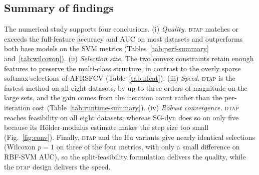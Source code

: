 \documentclass[]{interact}
\theoremstyle{plain}
\theoremstyle{definition}
\theoremstyle{remark}
\newcommand{\dtap}{\textsc{dtap}}
\begin{document}
\subsection{Summary of findings}\label{ssec:exp-summary}
The numerical study supports four conclusions. (i) \emph{Quality.} \dtap{} matches or exceeds the full-feature accuracy and AUC on most datasets and outperforms both base models on the SVM metrics (Tables~\ref{tab:perf-summary} and~\ref{tab:wilcoxon}). (ii) \emph{Selection size.} The two convex constraints retain enough features to preserve the multi-class structure, in contrast to the overly sparse softmax selections of AFRSFCV (Table~\ref{tab:nfeat}). (iii) \emph{Speed.} \dtap{} is the fastest method on all eight datasets, by up to three orders of magnitude on the large sets, and the gain comes from the iteration count rather than the per-iteration cost (Table~\ref{tab:runtime-summary}). (iv) \emph{Robust convergence.} \dtap{} reaches feasibility on all eight datasets, whereas SG-dyn does so on only five because its H\"older-modulus estimate makes the step size too small (Fig.~\ref{fig:conv}). Finally, \dtap{} and the Hu variants give nearly identical selections (Wilcoxon $p=1$ on three of the four metrics, with only a small difference on RBF-SVM AUC), so the split-feasibility formulation delivers the quality, while the \dtap{} design delivers the speed.
\end{document}
